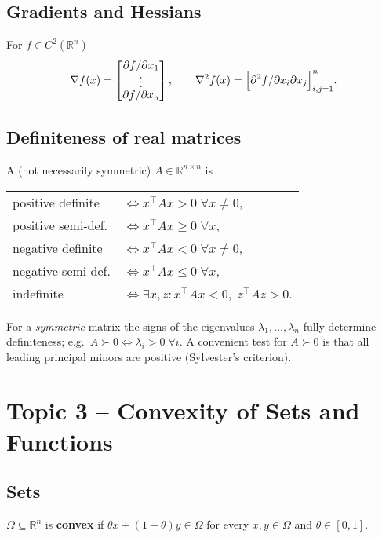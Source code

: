 \documentclass[12pt]{article}
\begin{document}
\subsection{Gradients and Hessians}
For \(f\in C^2(\mathbb R^n)\)
\[
\nabla f(x)=\begin{bmatrix}\partial f/\partial x_1\\[-2pt]\vdots\\[-2pt]\partial f/\partial x_n\end{bmatrix},
\qquad
\nabla^2 f(x)=
\Bigl[\partial^2 f/\partial x_i\partial x_j\Bigr]_{i,j=1}^n.
\]

\subsection{Definiteness of real matrices}
A (not necessarily symmetric) \(A\in\mathbb R^{n\times n}\) is
\begin{center}
\begin{tabular}{ll}
positive definite  & \(\iff x^\top Ax>0\;\forall x\ne0\),\\
positive semi-def. & \(\iff x^\top Ax\ge0\;\forall x\),\\
negative definite  & \(\iff x^\top Ax<0\;\forall x\ne0\),\\
negative semi-def. & \(\iff x^\top Ax\le0\;\forall x\),\\
indefinite         & \(\iff\exists x,z: x^\top Ax<0,\;z^\top Az>0\).
\end{tabular}
\end{center}

For a {\it symmetric} matrix the signs of the eigenvalues
\(\lambda_1,\dots,\lambda_n\) fully determine definiteness; e.g.\
\(A\succ0\iff\lambda_i>0\;\forall i\).
A convenient test for \(A\succ0\) is that all leading principal minors are
positive (Sylvester’s criterion).

\section{Topic 3 – Convexity of Sets and Functions}

\subsection{Sets}
\(\Omega\subseteq\mathbb R^n\) is {\bf convex} if
\(\theta x+(1-\theta)y\in\Omega\) for every \(x,y\in\Omega\) and
\(\theta\in[0,1]\).
\end{document}
